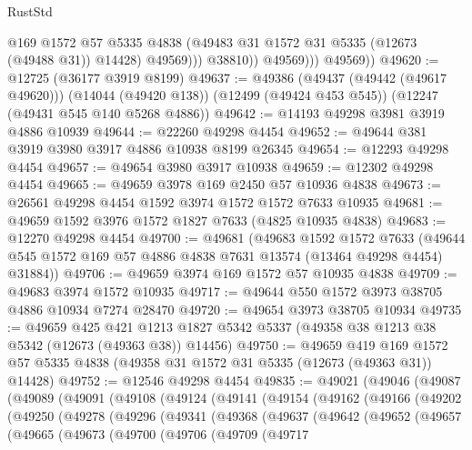 \begin{lexlean}{RustStd}
\begin{coremodule}
{\begin{coremodule}
{{{{{{{{{{{{{{{{{{{{{{{{{{{{{{{{{{{{{{{{{{{{{{{{{{{{{{{{{{{{{{{{{{{{{{{{{{{{{{{{                        @169
                        @1572
                        @57
                        @5335
                        @4838
                        (@49483 @31 @1572 @31 @5335 (@12673 (@49488 @31)) @14428)
                        @49569)))
                  @38810))
              @49569)))
        @49569))
@49620 := @12725 (@36177 @3919 @8199)
@49637 := @49386
    (@49437 (@49442 (@49617 @49620)))
    (@14044 (@49420 @138))
    (@12499 (@49424 @453 @545))
    (@12247 (@49431 @545 @140 @5268 @4886))
@49642 := @14193 @49298 @3981 @3919 @4886 @10939
@49644 := @22260 @49298 @4454
@49652 := @49644 @381 @3919 @3980 @3917 @4886 @10938 @8199 @26345
@49654 := @12293 @49298 @4454
@49657 := @49654 @3980 @3917 @10938
@49659 := @12302 @49298 @4454
@49665 := @49659 @3978 @169 @2450 @57 @10936 @4838
@49673 := @26561 @49298 @4454 @1592 @3974 @1572 @1572 @7633 @10935
@49681 := @49659 @1592 @3976 @1572 @1827 @7633 (@4825 @10935 @4838)
@49683 := @12270 @49298 @4454
@49700 := @49681
    (@49683
      @1592
      @1572
      @7633
      (@49644 @545 @1572 @169 @57 @4886 @4838 @7631 @13574 (@13464 @49298 @4454) @31884))
@49706 := @49659 @3974 @169 @1572 @57 @10935 @4838
@49709 := @49683 @3974 @1572 @10935
@49717 := @49644 @550 @1572 @3973 @38705 @4886 @10934 @7274 @28470
@49720 := @49654 @3973 @38705 @10934
@49735 := @49659
    @425
    @421
    @1213
    @1827
    @5342
    @5337
    (@49358 @38 @1213 @38 @5342 (@12673 (@49363 @38)) @14456)
@49750 := @49659
    @419
    @169
    @1572
    @57
    @5335
    @4838
    (@49358 @31 @1572 @31 @5335 (@12673 (@49363 @31)) @14428)
@49752 := @12546 @49298 @4454
@49835 := @49021
    (@49046
      (@49087
        (@49089
          (@49091
            (@49108
              (@49124
                (@49141
                  (@49154
                    (@49162
                      (@49166
                        (@49202
                          (@49250
                            (@49278
                              (@49296
                                (@49341
                                  (@49368
                                    (@49637
                                      (@49642
                                        (@49652
                                          (@49657
                                            (@49665
                                              (@49673
                                                (@49700
                                                  (@49706
                                                    (@49709
                                                      (@49717
}}}}}}}}}}}}}}}}}}}}}}}}}}}}}}}}}}}}}}}}}}}}}}}}}}}}}}}}}}}}}}}}}}}}}}}}}}}}}}}}
\end{coremodule}}
\end{coremodule}
\end{lexlean}

